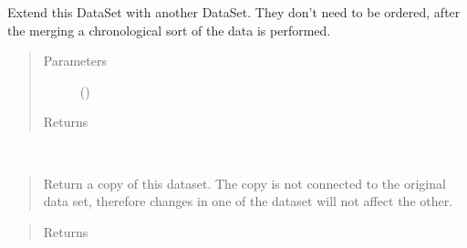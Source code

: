 \documentclass[letterpaper,10pt,english]{sphinxmanual}
\begin{document}
\begin{fulllineitems}
\begin{fulllineitems}
\label{\detokenize{yaocptool.modelling:yaocptool.modelling.dataset.DataSet.extend}}
Extend this DataSet with another DataSet. They don’t need to be ordered, after the merging a chronological
sort of the data is performed.
\begin{quote}\begin{description}
\item[{Parameters}] \leavevmode
{} ({\hyperref[\detokenize{yaocptool.modelling:yaocptool.modelling.dataset.DataSet}]{}}) \textendash{} 

\item[{Returns}] \leavevmode


\end{description}\end{quote}

\end{fulllineitems}


\begin{fulllineitems}
\label{\detokenize{yaocptool.modelling:yaocptool.modelling.dataset.DataSet.get_copy}}~\begin{quote}

Return a copy of this dataset. The copy is not connected to the original data set, therefore changes in one
of the dataset will not affect the other.
\end{quote}
\begin{quote}\begin{description}
\item[{Returns}] \leavevmode


\end{description}\end{quote}

\end{fulllineitems}


\begin{fulllineitems}
\label{\detokenize{yaocptool.modelling:yaocptool.modelling.dataset.DataSet.get_entry}}~\begin{quote}


\end{quote}
\end{fulllineitems}
\end{fulllineitems}
\end{document}
